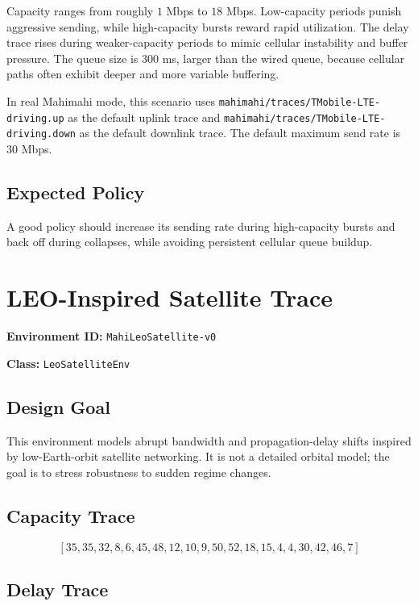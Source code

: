 \documentclass[11pt]{article}
\begin{document}
Capacity ranges from roughly \(1\) Mbps to \(18\) Mbps. Low-capacity periods
punish aggressive sending, while high-capacity bursts reward rapid utilization.
The delay trace rises during weaker-capacity periods to mimic cellular
instability and buffer pressure. The queue size is \(300\) ms, larger than the
wired queue, because cellular paths often exhibit deeper and more variable
buffering.

In real Mahimahi mode, this scenario uses
\texttt{mahimahi/traces/TMobile-LTE-driving.up} as the default uplink trace and
\texttt{mahimahi/traces/TMobile-LTE-driving.down} as the default downlink trace.
The default maximum send rate is \(30\) Mbps.

\subsection{Expected Policy}

A good policy should increase its sending rate during high-capacity bursts and
back off during collapses, while avoiding persistent cellular queue buildup.

\section{LEO-Inspired Satellite Trace}

\textbf{Environment ID:} \texttt{MahiLeoSatellite-v0}

\textbf{Class:} \texttt{LeoSatelliteEnv}

\subsection{Design Goal}

This environment models abrupt bandwidth and propagation-delay shifts inspired
by low-Earth-orbit satellite networking. It is not a detailed orbital model;
the goal is to stress robustness to sudden regime changes.

\subsection{Capacity Trace}

\[
[35, 35, 32, 8, 6, 45, 48, 12, 10, 9,
50, 52, 18, 15, 4, 4, 30, 42, 46, 7]
\]

\subsection{Delay Trace}
\end{document}
